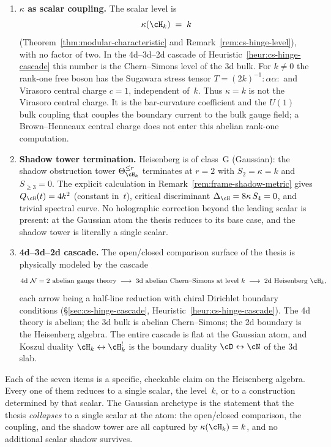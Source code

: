 \begin{enumerate}
\item \textbf{$\kappa$ as scalar coupling.}
The scalar level is
\[
 \kappa(\cH_k) \;=\; k
\]
(Theorem~\ref{thm:modular-characteristic} and
Remark~\ref{rem:cs-hinge-level}), with no factor of two. In the 4d--3d--2d cascade of
Heuristic~\ref{heur:cs-hinge-cascade} this number is the
Chern--Simons level of the 3d bulk. For $k\neq0$ the rank-one
free boson has the Sugawara stress tensor
$T=(2k)^{-1}:\!\alpha\alpha\!:$ and Virasoro central charge
$c=1$, independent of~$k$. Thus $\kappa=k$ is not the Virasoro
central charge. It is the bar-curvature coefficient and the
$U(1)$ bulk coupling that couples the boundary current to the
bulk gauge field; a Brown--Henneaux central charge does not enter
this abelian rank-one computation.

\item \textbf{Shadow tower termination.}
Heisenberg is of class~G (Gaussian): the shadow obstruction tower
$\Theta_{\cH_k}^{\leq r}$ terminates at $r = 2$ with
$S_2 = \kappa = k$ and $S_{\geq 3} = 0$. The explicit calculation
in Remark~\ref{rem:frame-shadow-metric} gives
$Q_{\cH}(t) = 4k^2$ (constant in~$t$), critical discriminant
$\Delta_{\cH} = 8\kappa\,S_4 = 0$, and trivial spectral curve. No
holographic correction beyond the leading scalar is present: at the
Gaussian atom the thesis reduces to its base case, and the shadow
tower is literally a single scalar.

\item \textbf{4d--3d--2d cascade.}
The open/closed comparison surface of the thesis is physically
modeled by the cascade
\[
 \text{4d $\mathcal{N}=2$ abelian gauge theory}
 \;\longrightarrow\;
 \text{3d abelian Chern--Simons at level } k
 \;\longrightarrow\;
 \text{2d Heisenberg } \cH_k,
\]
each arrow being a half-line reduction with chiral Dirichlet
boundary conditions (\S\ref{sec:cs-hinge-cascade},
Heuristic~\ref{heur:cs-hinge-cascade}). The 4d theory is abelian;
the 3d bulk is abelian Chern--Simons; the 2d boundary is the
Heisenberg algebra. The entire cascade is flat at the Gaussian
atom, and Koszul duality
$\cH_k \leftrightarrow \cH_k^!$ is the boundary duality
$\cD \leftrightarrow \cN$ of the 3d slab.
\end{enumerate}

Each of the seven items is a specific, checkable claim on the
Heisenberg algebra. Every one of them reduces to a single scalar,
the level~$k$, or to a construction determined by that scalar. The
Gaussian archetype is the statement that the thesis \emph{collapses}
to a single scalar at the atom: the open/closed comparison, the
coupling, and the shadow tower are all captured by
$\kappa(\cH_k) = k$, and no additional scalar shadow survives.

